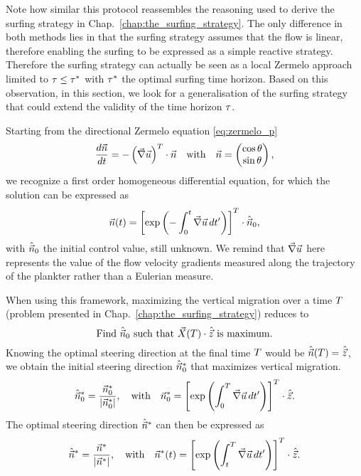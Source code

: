 Note how similar this protocol reassembles the reasoning used to derive the surfing strategy in Chap.~\ref{chap:the_surfing_strategy}.
The only difference in both methods lies in that the surfing strategy assumes that the flow is linear, therefore enabling the surfing to be expressed as a simple reactive strategy.
Therefore the surfing strategy can actually be seen as a local Zermelo approach limited to $\tau \le \tau^*$ with $\tau^*$ the optimal surfing time horizon.
Based on this observation, in this section, we look for a generalisation of the surfing strategy that could extend the validity of the time horizon $\tau$.

Starting from the directional Zermelo equation \ref{eq:zermelo_p}
\begin{equation}
	\frac{d \vec{n}}{d t}
	= -\left( \vec{\nabla} \vec{u} \right)^T \cdot \vec{n} \quad \text{with} \quad \vec{n} = \begin{pmatrix}
		\cos \theta \\
		\sin \theta
	\end{pmatrix},
\end{equation}
we recognize a first order homogeneous differential equation, for which the solution can be expressed as
\begin{equation}
	\label{eq:zermelo_exp_p}
	\vec{n}(t) = \left[ \exp \left( - \int_0^t \vec{\nabla} \vec{u} \, dt' \right) \right]^T \cdot \hat{\vec{n}}_0,
\end{equation}
with $\hat{\vec{n}}_0$ the initial control value, still unknown.
We remind that $\vec{\nabla} \vec{u}$ here represents the value of the flow velocity gradients measured along the trajectory of the plankter rather than a Eulerian measure.

When using this framework, maximizing the vertical migration over a time $T$ (problem presented in Chap.~\ref{chap:the_surfing_strategy}) reduces to
\begin{equation}
	\text{Find} ~ \hat{\vec{n}}_0 ~ \text{such that} ~ \vec{X}(T) \cdot \hat{\vec{z}} ~ \text{is maximum}.
\end{equation}
Knowing the optimal steering direction at the final time $T$ would be $\hat{\vec{n}}(T) = \hat{\vec{z}}$, we obtain the initial steering direction $\hat{\vec{n}}_0^*$ that maximizes vertical migration. 
\begin{equation}
	\hat{\vec{n}}_0^* = \frac{\vec{n}_0^*}{\lvert\vec{n}_0^*\rvert}, \quad \text{with} \quad \vec{n}_0^* = \left[ \exp \left( \int_0^T \vec{\nabla} \vec{u} \, dt' \right) \right]^T \cdot \hat{\vec{z}}.
\end{equation}
The optimal steering direction $\hat{\vec{n}}^*$ can then be expressed as
\begin{equation}
	\label{eq:zermelo_optimal_swimming_direction}
	\hat{\vec{n}}^* = \frac{\vec{n}^*}{\lvert\vec{n}^*\rvert}, \quad \text{with} \quad \vec{n}^*(t) = \left[ \exp \left( \int_t^T \vec{\nabla} \vec{u} \, dt' \right) \right]^T \cdot \hat{\vec{z}}.
\end{equation}

